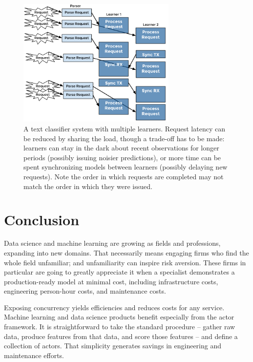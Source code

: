 \documentclass[tablecaption=bottom,wcp]{jmlr}
\begin{document}
\begin{figure}[h]
\includegraphics[width=0.7\textwidth]{fig/tex/double_txt_cls.png}
\centering
\caption{A text classifier system with multiple learners. Request latency can be reduced
by sharing the load, though a trade-off has to be made: learners can stay in the dark 
about recent observations for longer periods (possibly issuing noisier predictions), or 
more time can be spent synchronizing models between learners (possibly delaying 
new requests). Note the order in which requests are completed may not match the 
order in which they were issued.}
\label{fig_txt_cls_dbl}
\end{figure}

\section{Conclusion}

Data science and machine learning are growing as fields and professions, 
expanding into new domains. That necessarily means engaging firms who 
find the whole field unfamiliar; and unfamiliarity can inspire risk aversion. 
These firms in particular are going to greatly appreciate it when a specialist
demonstrates a production-ready model at minimal cost, including infrastructure
costs, engineering person-hour costs, and maintenance costs.

Exposing concurrency yields efficiencies and reduces costs for any service.
Machine learning and data science products benefit especially from the actor 
framework. It is straightforward to take the standard procedure -- gather raw data, 
produce features from that data, and score those features -- and define a collection 
of actors. That simplicity generates savings in engineering and maintenance efforts.
\end{document}
